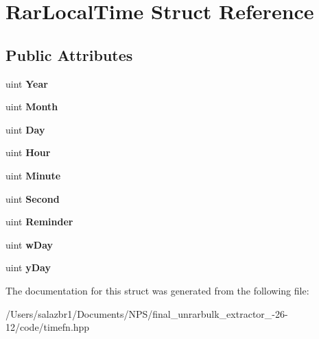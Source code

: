 \hypertarget{struct_rar_local_time}{\section{Rar\-Local\-Time Struct Reference}
\label{struct_rar_local_time}
}
\subsection*{Public Attributes}
\begin{DoxyCompactItemize}
\item 
\hypertarget{struct_rar_local_time_a0612ce733599013bfe8333ad1627894f}{uint {\bfseries Year}}\label{struct_rar_local_time_a0612ce733599013bfe8333ad1627894f}

\item 
\hypertarget{struct_rar_local_time_aece541270dd7e6b58c5966752121dd16}{uint {\bfseries Month}}\label{struct_rar_local_time_aece541270dd7e6b58c5966752121dd16}

\item 
\hypertarget{struct_rar_local_time_ae04ec4a429fc6ef418db4450e0807427}{uint {\bfseries Day}}\label{struct_rar_local_time_ae04ec4a429fc6ef418db4450e0807427}

\item 
\hypertarget{struct_rar_local_time_ab0d111bb6dfe5a641b82a74ca24410ef}{uint {\bfseries Hour}}\label{struct_rar_local_time_ab0d111bb6dfe5a641b82a74ca24410ef}

\item 
\hypertarget{struct_rar_local_time_a1dd6e4235983ba2c857f495872575ff1}{uint {\bfseries Minute}}\label{struct_rar_local_time_a1dd6e4235983ba2c857f495872575ff1}

\item 
\hypertarget{struct_rar_local_time_a949249b7c6315c528cdaa5cf368cea0b}{uint {\bfseries Second}}\label{struct_rar_local_time_a949249b7c6315c528cdaa5cf368cea0b}

\item 
\hypertarget{struct_rar_local_time_a23b0c6bba4a3fec149bdb7548057d4fc}{uint {\bfseries Reminder}}\label{struct_rar_local_time_a23b0c6bba4a3fec149bdb7548057d4fc}

\item 
\hypertarget{struct_rar_local_time_a4b8a3134ee53f0811e8c2dcf1fef8393}{uint {\bfseries w\-Day}}\label{struct_rar_local_time_a4b8a3134ee53f0811e8c2dcf1fef8393}

\item 
\hypertarget{struct_rar_local_time_a33121af8c5187f93526bc9b7a02ea323}{uint {\bfseries y\-Day}}\label{struct_rar_local_time_a33121af8c5187f93526bc9b7a02ea323}

\end{DoxyCompactItemize}


The documentation for this struct was generated from the following file\-:\begin{DoxyCompactItemize}
\item 
/\-Users/salazbr1/\-Documents/\-N\-P\-S/final\-\_\-unrarbulk\-\_\-extractor\-\_-\/26-\/12/code/timefn.\-hpp\end{DoxyCompactItemize}
